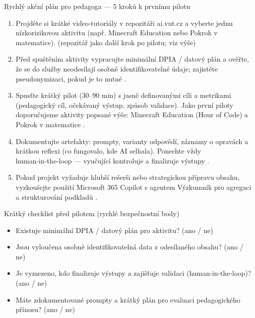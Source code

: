 Rychlý akční plán pro pedagoga — 5 kroků k prvnímu pilotu
\begin{enumerate}
  \item Projděte si krátké video‑tutoriály v repozitáři ai.vut.cz a vyberte jednu nízkorizikovou aktivitu (např. Minecraft Education nebo Pokrok v matematice). (repozitář jako další krok po pilotu; viz výše)
  \item Před spuštěním aktivity vypracujte minimální DPIA / datový plán a ověřte, že se do služby neodesílají osobně identifikovatelné údaje; zajistěte pseudonymizaci, pokud je to nutné \cite{kb_malinka_chatgpt_ve_vyuce_dva_roky_pote_2024_pdf_90bc3aaf_page_12_1}.
  \item Spusťte krátký pilot (30–90 min) s jasně definovanými cíli a metrikami (pedagogický cíl, očekávaný výstup, způsob validace). Jako první piloty doporučujeme aktivity popsané výše: Minecraft Education (Hour of Code) a Pokrok v matematice \cite{kb_ai_101_tipu_pdf_04e4a115_page_15_2,kb_ai_101_tipu_pdf_04e4a115_page_8_1}.
  \item Dokumentujte artefakty: prompty, varianty odpovědí, záznamy o opravách a krátkou reflexi (co fungovalo, kde AI selhala). Ponechte vždy human‑in‑the‑loop — vyučující kontroluje a finalizuje výstupy \cite{kb_malinka_chatgpt_ve_vyuce_dva_roky_pote_2024_pdf_90bc3aaf_page_12_1}.
  \item Pokud projekt vyžaduje hlubší rešerši nebo strategickou přípravu obsahu, vyzkoušejte použití Microsoft 365 Copilot s agentem Výzkumník pro agregaci a strukturování podkladů \cite{kb_ai_101_tipu_pdf_04e4a115_page_48_1}.
\end{enumerate}

Krátký checklist před pilotem (rychlé bezpečnostní body)
\begin{itemize}
  \item Existuje minimální DPIA / datový plán pro aktivitu? (ano / ne) \cite{kb_malinka_chatgpt_ve_vyuce_dva_roky_pote_2024_pdf_90bc3aaf_page_12_1}
  \item Jsou vyloučena osobně identifikovatelná data z odesílaného obsahu? (ano / ne) \cite{kb_malinka_chatgpt_ve_vyuce_dva_roky_pote_2024_pdf_90bc3aaf_page_12_1}
  \item Je vymezeno, kdo finalizuje výstupy a zajišťuje validaci (human‑in‑the‑loop)? (ano / ne) \cite{kb_malinka_chatgpt_ve_vyuce_dva_roky_pote_2024_pdf_90bc3aaf_page_12_1}
  \item Máte zdokumentované prompty a krátký plán pro evaluaci pedagogického přínosu? (ano / ne)
\end{itemize}

